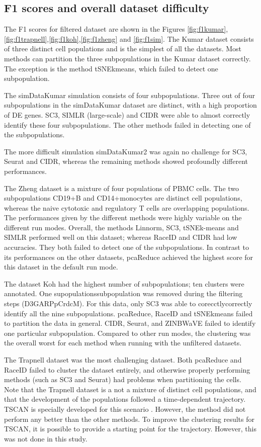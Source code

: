 \documentclass[12pt, a4paper]{article}\usepackage[]{graphicx}\usepackage[]{color}
\begin{document}
\subsection{F1 scores and overall dataset difficulty}


The F1 scores for filtered dataset are shown in the Figures \ref{fig:f1kumar},\ref{fig:f1trapnell},\ref{fig:f1koh},\ref{fig:f1zheng} and \ref{fig:f1sim}. The Kumar dataset consists of three distinct cell populations and is the simplest of all the datasets. Most methods can partition the three subpopulations in the Kumar dataset correctly. The exception is the method tSNEkmeans, which failed to detect one subpopulation. 

The simDataKumar simulation consists of four subpopulations. Three out of four subpopulations in the simDataKumar dataset are distinct, with a high proportion of DE genes. SC3, SIMLR (large-scale) and CIDR were able to almost correctly identify these four subpopulations. The other methods failed in detecting one of the subpopulations.  

The more difficult simulation simDataKumar2 was again no challenge for SC3, Seurat and CIDR, whereas the remaining methods showed profoundly different performances. 

The Zheng dataset is a mixture of four populations of PBMC cells. The two subpopulations CD19+B and CD14+monocytes are distinct cell populations, whereas the naive cytotoxic and regulatory T cells are overlapping populations. The performances given by the different methods were highly variable on the different run modes. Overall, the methods Linnorm, SC3, tSNEk-means and SIMLR performed well on this dataset; whereas RaceID and CIDR had low accuracies. They both failed to detect one of the subpopulations. In contrast to its performances on the other datasets, pcaReduce achieved the highest score for this dataset in the default run mode.

The dataset Koh had the highest number of subpopulations;  ten clusters were annotated. One supopulationssubpopulation was removed during the filtering steps (D3GARPpCrdcM). For this data, only SC3 was able to corecctlycorrectly identify all the nine subpopulations. pcaReduce, RaceID and tSNEkmeans failed to partition the data in general. CIDR, Seurat, and ZINBWaVE failed to identify one particular subpopulation. Compared to other run modes, the clustering was the overall worst for each method when running with the unfiltered datasets. 

The Trapnell dataset was the most challenging dataset. Both pcaReduce and RaceID failed to cluster the dataset entirely, and otherwise properly performing methods (such as SC3 and Seurat) had problems when partitioning the cells. Note that the Trapnell dataset is a not a mixture of distinct cell populations, and that the development of the populations followed a time-dependent trajectory. TSCAN is specially developed for this scenario \citep{ji2015tscan}. However, the method did not perform any better than the other methods. To improve the clustering results for TSCAN, it is possible to provide a starting point for the trajectory. However, this was not done in this study. 
\end{document}
